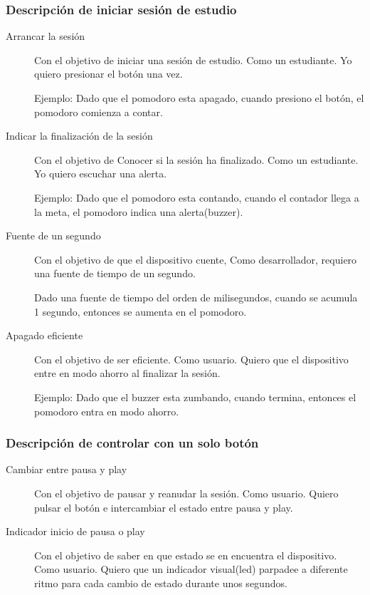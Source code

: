 \documentclass{article}
\begin{document}
\subsubsection{Descripción de iniciar sesión de estudio}
\begin{description}
	\item [Arrancar la sesión] Con el objetivo de iniciar una sesión de 
		estudio. Como un estudiante. Yo quiero presionar el botón una
		vez.

		\CheckedBox Ejemplo: Dado que el pomodoro esta apagado, cuando 
		presiono el
		botón, el pomodoro comienza a contar.
	
	\item [Indicar la finalización de la sesión] Con el objetivo de Conocer
		si la sesión ha finalizado. Como un estudiante. Yo quiero 
		escuchar una alerta.

		\CheckedBox Ejemplo: Dado que el pomodoro esta contando, cuando 
		el contador
		llega a la meta, el pomodoro indica una alerta(buzzer).
	\item [Fuente de un segundo] Con el objetivo de que el dispositivo 
		cuente, Como desarrollador, requiero una fuente de tiempo de
		un segundo.
		
		\CheckedBox Dado una fuente de tiempo del orden de milisegundos,
		cuando se acumula 1 segundo, entonces se aumenta en el pomodoro.

	\item [Apagado eficiente] Con el objetivo de ser eficiente. 
		Como usuario. Quiero que el dispositivo entre en modo ahorro
		al finalizar la sesión.

		\CheckedBox Ejemplo: Dado que el buzzer esta zumbando, cuando 
		termina, entonces el pomodoro entra en modo ahorro.
\end{description}
\subsubsection{Descripción de controlar con un solo botón}
\begin{description}
	\item[Cambiar entre pausa y play] Con el objetivo de pausar y reanudar
		la sesión. Como usuario. Quiero pulsar el botón e intercambiar
		el estado entre pausa y play.

	\item[Indicador inicio de pausa o play] Con el objetivo de saber en que
		estado se en encuentra el dispositivo. Como usuario. Quiero que
		un indicador visual(led) parpadee a diferente ritmo para cada 
		cambio de estado durante unos segundos.
\end{description}
\end{document}

